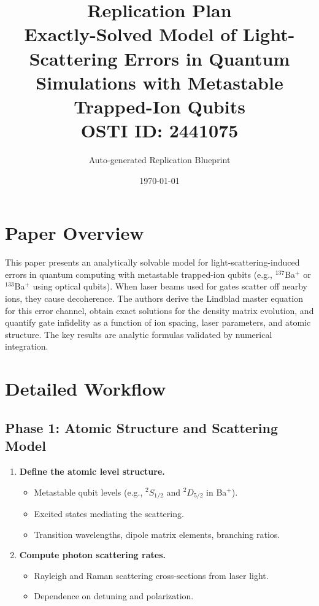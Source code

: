 \documentclass[11pt,a4paper]{article}
\title{\textbf{Replication Plan}\\[0.5em]
\large Exactly-Solved Model of Light-Scattering Errors in Quantum Simulations with Metastable Trapped-Ion Qubits\\[0.3em]
\normalsize OSTI ID: 2441075}
\author{Auto-generated Replication Blueprint}
\date{\today}
\begin{document}
\maketitle
\tableofcontents
\newpage

\section{Paper Overview}
This paper presents an analytically solvable model for light-scattering-induced errors in quantum computing with metastable trapped-ion qubits (e.g., $^{137}$Ba$^+$ or $^{133}$Ba$^+$ using optical qubits). When laser beams used for gates scatter off nearby ions, they cause decoherence. The authors derive the Lindblad master equation for this error channel, obtain exact solutions for the density matrix evolution, and quantify gate infidelity as a function of ion spacing, laser parameters, and atomic structure. The key results are analytic formulas validated by numerical integration.

\section{Detailed Workflow}

\subsection{Phase 1: Atomic Structure and Scattering Model}
\begin{enumerate}[label=\textbf{1.\arabic*}]
  \item \textbf{Define the atomic level structure.}
    \begin{itemize}
      \item Metastable qubit levels (e.g., $^2S_{1/2}$ and $^2D_{5/2}$ in Ba$^+$).
      \item Excited states mediating the scattering.
      \item Transition wavelengths, dipole matrix elements, branching ratios.
    \end{itemize}
  \item \textbf{Compute photon scattering rates.}
    \begin{itemize}
      \item Rayleigh and Raman scattering cross-sections from laser light.
      \item Dependence on detuning and polarization.
    \end{itemize}
\end{enumerate}
\end{document}
